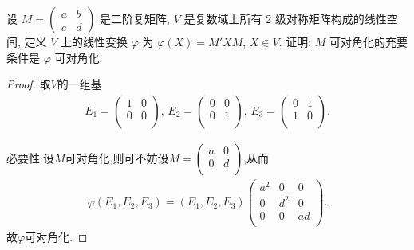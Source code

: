 \documentclass[../../main.tex]{subfiles}%
\begin{document}
\begin{example}
设 $M = \begin{pmatrix} a & b \\ c & d \end{pmatrix}$ 是二阶复矩阵, $V$ 是复数域上所有 2 级对称矩阵构成的线性空间, 定义 $V$ 上的线性变换 $\varphi$ 为 $\varphi(X) = M'XM$, $X \in V$. 证明: $M$ 可对角化的充要条件是 $\varphi$ 可对角化.
\end{example}
\begin{proof}

取$V$的一组基
\begin{align*}
E_1=\begin{pmatrix}
1&		0\\
0&		0\\
\end{pmatrix},\,E_2=\begin{pmatrix}
0&		0\\
0&		1\\
\end{pmatrix},\,E_3=\begin{pmatrix}
0&		1\\
1&		0\\
\end{pmatrix}.
\end{align*}

{\heiti 必要性:}设$M$可对角化,则可不妨设$M=\begin{pmatrix}
a&		0\\
0&		d\\
\end{pmatrix}$,从而
\begin{align*}
\varphi(E_1,E_2,E_3)=(E_1,E_2,E_3)\begin{pmatrix}
a^2&		0&		0\\
0&		d^2&		0\\
0&		0&		ad\\
\end{pmatrix}.
\end{align*}
故$\varphi$可对角化.


\end{proof}
\end{document}
